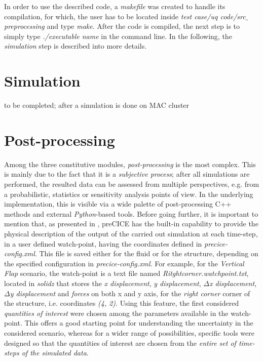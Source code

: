 	In order to use the described code, a \emph{makefile} was created to handle its compilation, for which, the user has to be located inside \emph{test case/uq code/src$\_$preprocessing} and type \emph{make}. After the code is compiled, the next step is to simply type \emph{./executable name} in the command line. In the following, the \emph{simulation} step is described into more details.
\section{Simulation}
\label{sec:Simulation}
to be completed; after a simulation is done on MAC cluster  
\section{Post-processing}
\label{sec:Post-processing}  
	
	Among the three constitutive modules, \emph{post-processing} is the most complex. This is mainly due to the fact that it is a \emph{subjective process}; after all simulations are performed, the resulted data can be assessed from multiple perspectives, e.g. from a probabilistic, statistics or sensitivity analysis points of view. In the underlying implementation, this is visible via a wide palette of post-processing C++ methods and external \emph{Python}-based tools. Before going further, it is important to mention that, as presented in , preCICE has the built-in capability to provide the physical description of the output of the carried out simulation at each time-step, in a user defined watch-point, having the coordinates defined in \emph{precice-config.xml}. This file is saved either for the fluid or for the structure, depending on the specified configuration in \emph{precice-config.xml}. For example, for the \emph{Vertical Flap} scenario, the watch-point is a text file named \emph{Ritghtcorner.watchpoint.txt}, located in \emph{solidz} that stores the \emph{x displacement}, \emph{y displacement}, \emph{$\Delta$x displacement}, \emph{$\Delta$y displacement} and \emph{forces} on both x and y axis, for the \emph{right corner} corner of the structure, i.e. coordinates \emph{(4, 2)}. Using this feature, the first considered \emph{quantities of interest} were chosen among the parameters available in the watch-point. This offers a good starting point for understanding the uncertainty in the considered scenario, whereas for a wider range of possibilities, specific tools were designed so that the quantities of interest are chosen from the \emph{entire set of time-steps of the simulated data}.
	
